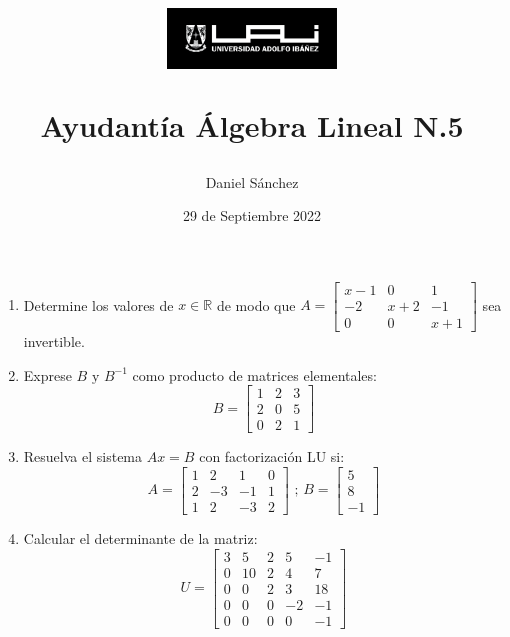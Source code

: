 \documentclass[12pt]{article}
\begin{document}
\title{
    \begin{figure}[ht]
        \centering
        \includegraphics[width = 0.4\textwidth, ]{../../logo-uai.jpg}\\
    \end{figure}
    Ayudant\'ia \'Algebra Lineal N.5}
\date{29 de Septiembre 2022}
\author{Daniel S\'anchez}
\maketitle

\begin{enumerate}

    \item Determine los valores de $x \in \mathbb{R}$ de modo que
          $A=\begin{bmatrix}
                  x-1 & 0   & 1   \\
                  -2  & x+2 & -1  \\
                  0   & 0   & x+1
              \end{bmatrix}$ sea invertible.
    \item Exprese $B \mbox{ y } B^{-1}$ como producto de matrices elementales:
          $$B=\begin{bmatrix}
                  1 & 2 & 3 \\
                  2 & 0 & 5 \\
                  0 & 2 & 1
              \end{bmatrix}$$

    \item Resuelva el sistema $Ax=B$ con factorizaci\'on LU si:
          $$A=\begin{bmatrix}
                  1 & 2  & 1  & 0 \\
                  2 & -3 & -1 & 1 \\
                  1 & 2  & -3 & 2
              \end{bmatrix}\mbox{ ; } B=\begin{bmatrix}
                  5 \\
                  8 \\
                  -1
              \end{bmatrix}$$

    \item Calcular el determinante de la matriz:
          $$U=\begin{bmatrix}
                  3 & 5  & 2 & 5  & -1 \\
                  0 & 10 & 2 & 4  & 7  \\
                  0 & 0  & 2 & 3  & 18 \\
                  0 & 0  & 0 & -2 & -1 \\
                  0 & 0  & 0 & 0  & -1
              \end{bmatrix}$$


\end{enumerate}
\end{document}
